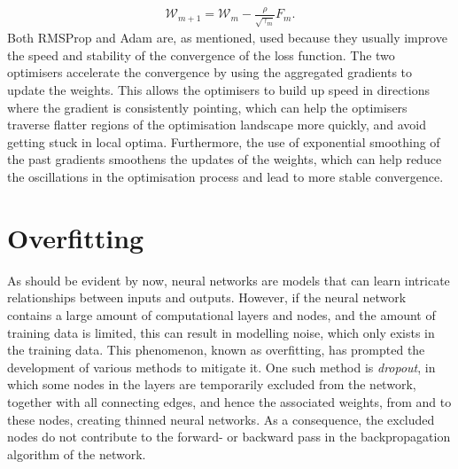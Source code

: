 \begin{align}\label{Eq:Adam_updatew}
    \mathcal{W}_{m+1} = \mathcal{W}_{m} - \frac{\rho}{\sqrt{\gamma_m}}F_m.
\end{align} 
Both RMSProp and Adam are, as mentioned, used because they usually improve the speed and stability of the convergence of the loss function. The two optimisers accelerate the convergence by using the aggregated gradients to update the weights. This allows the optimisers to build up speed in directions where the gradient is consistently pointing, which can help the optimisers traverse flatter regions of the optimisation landscape more quickly, and avoid getting stuck in local optima. Furthermore, the use of exponential smoothing of the past gradients smoothens the updates of the weights, which can help reduce the oscillations in the optimisation process and lead to more stable convergence.


\section{Overfitting}
As should be evident by now, neural networks are models that can learn intricate relationships between inputs and outputs. However, if the neural network contains a large amount of computational layers and nodes, and the amount of training data is limited, this can result in modelling noise, which only exists in the training data. This phenomenon, known as overfitting, has prompted the development of various methods to mitigate it. One such method is \emph{dropout}, in which some nodes in the layers are temporarily excluded from the network, together with all connecting edges, and hence the associated weights, from and to these nodes, creating thinned neural networks. As a consequence, the excluded nodes do not contribute to the forward- or backward pass in the backpropagation algorithm of the network. 

